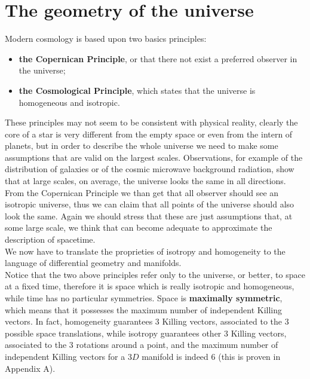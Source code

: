 \section{The geometry of the universe}
Modern cosmology is based upon two basics principles:
\begin{itemize}
    \item \textbf{the Copernican Principle}, or that there not exist a preferred observer in the universe;
    \item \textbf{the Cosmological Principle}, which states that the universe is homogeneous and isotropic.
\end{itemize}
These principles may not seem to be consistent with physical reality, clearly the core of a star is very different from the empty space or even from the intern of planets, but in order to describe the whole universe we need to make some assumptions that are valid on the largest scales. Observations, for example of the distribution of galaxies or of the cosmic microwave background radiation, show that at large scales, on average, the universe looks the same in all directions. From the Copernican Principle we than get that all observer should see an isotropic universe, thus we can claim that all points of the universe should also look the same. Again we should stress that these are just assumptions that, at some large scale, we think that can become adequate to approximate the description of spacetime.\\

We now have to translate the proprieties of isotropy and homogeneity to the language of differential geometry and manifolds.\\ Notice that the two above principles refer only to the universe, or better, to space at a fixed time, therefore it is space which is really isotropic and homogeneous, while time has no particular symmetries.
Space is \textbf{maximally symmetric}, which means that it possesses the maximum number of independent Killing vectors. In fact, homogeneity guarantees 3 Killing vectors, associated to the 3 possible space translations, while isotropy guarantees other 3 Killing vectors, associated to the 3 rotations around a point, and the maximum number of independent Killing vectors for a $3D$ manifold is indeed 6 (this is proven in Appendix A).
